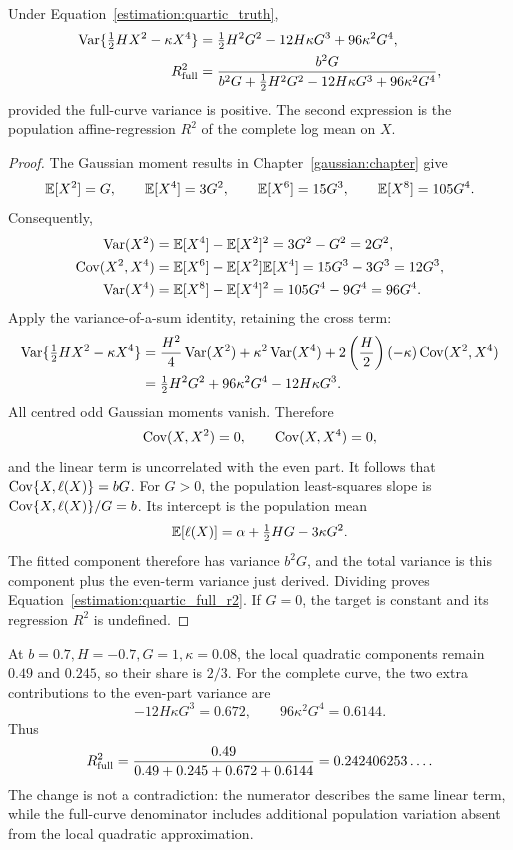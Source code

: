 \begin{proposition}
\label{estimation:quartic_variance}
Under Equation~\eqref{estimation:quartic_truth},
\begin{align}
 \operatorname{Var}\{\tfrac12HX^2-\kappa X^4\}
 &=\tfrac12H^2G^2-12H\kappa G^3+96\kappa^2G^4,\nonumber\\
 R_{\rm full}^2
 &=\frac{b^2G}
 {b^2G+\tfrac12H^2G^2-12H\kappa G^3+96\kappa^2G^4},
 \label{estimation:quartic_full_r2}
\end{align}
provided the full-curve variance is positive. The second expression is the
population affine-regression \(R^2\) of the complete log mean on \(X\).
\end{proposition}

\begin{proof}
The Gaussian moment results in Chapter~\ref{gaussian:chapter} give
\[
 \mathbb E[X^2]=G,\qquad \mathbb E[X^4]=3G^2,\qquad
 \mathbb E[X^6]=15G^3,\qquad \mathbb E[X^8]=105G^4.
\]
Consequently,
\begin{align*}
 \operatorname{Var}(X^2)
 &=\mathbb E[X^4]-\mathbb E[X^2]^2=3G^2-G^2=2G^2,\\
 \operatorname{Cov}(X^2,X^4)
 &=\mathbb E[X^6]-\mathbb E[X^2]\mathbb E[X^4]
   =15G^3-3G^3=12G^3,\\
 \operatorname{Var}(X^4)
 &=\mathbb E[X^8]-\mathbb E[X^4]^2
   =105G^4-9G^4=96G^4.
\end{align*}
Apply the variance-of-a-sum identity, retaining the cross term:
\begin{align*}
 \operatorname{Var}\{\tfrac12HX^2-\kappa X^4\}
 &=\frac{H^2}{4}\operatorname{Var}(X^2)
   +\kappa^2\operatorname{Var}(X^4)
   +2\left(\frac H2\right)(-\kappa)\operatorname{Cov}(X^2,X^4)\\
 &=\tfrac12H^2G^2+96\kappa^2G^4-12H\kappa G^3.
\end{align*}
All centred odd Gaussian moments vanish. Therefore
\[
 \operatorname{Cov}(X,X^2)=0,\qquad \operatorname{Cov}(X,X^4)=0,
\]
and the linear term is uncorrelated with the even part.
It follows that \(\operatorname{Cov}\{X,\ell(X)\}=bG\).
For \(G>0\), the population least-squares slope is
\(\operatorname{Cov}\{X,\ell(X)\}/G=b\). Its intercept is the population mean
\[
 \mathbb E[\ell(X)]=\alpha+\tfrac12HG-3\kappa G^2.
\]
The fitted component therefore has variance \(b^2G\), and the total
variance is this component plus the even-term variance just derived.
Dividing proves Equation~\eqref{estimation:quartic_full_r2}.
If \(G=0\), the target is constant and its regression \(R^2\) is undefined.
\end{proof}

At \(b=0.7,H=-0.7,G=1,\kappa=0.08\), the local quadratic components remain
\(0.49\) and \(0.245\), so their share is \(2/3\). For the complete curve,
the two extra contributions to the even-part variance are
\[
 -12H\kappa G^3=0.672,\qquad
 96\kappa^2G^4=0.6144.
\]
Thus
\[
 R_{\rm full}^2
 =\frac{0.49}{0.49+0.245+0.672+0.6144}
 =0.242406253\ldots.
\]
The change is not a contradiction: the numerator describes the same linear
term, while the full-curve denominator includes additional population
variation absent from the local quadratic approximation.

